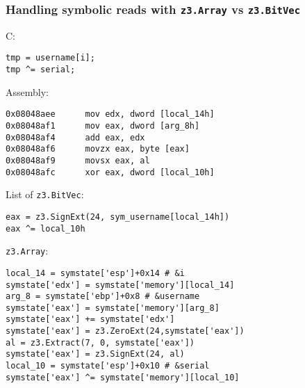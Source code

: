 \documentclass[aspectratio=169]{beamer}
\begin{document}
\begin{frame}[fragile]
\frametitle{Handling symbolic reads with \texttt{z3.Array} vs \texttt{z3.BitVec}}
\begin{minipage}{0.46\textwidth}
C:
\begin{Verbatim}[fontsize=\scriptsize, frame=single]
tmp = username[i];
tmp ^= serial;
\end{Verbatim}
Assembly:
\begin{Verbatim}[fontsize=\scriptsize, frame=single]
0x08048aee      mov edx, dword [local_14h]
0x08048af1      mov eax, dword [arg_8h]
0x08048af4      add eax, edx
0x08048af6      movzx eax, byte [eax]
0x08048af9      movsx eax, al
0x08048afc      xor eax, dword [local_10h]
\end{Verbatim}
\end{minipage}
\begin{minipage}{0.53\textwidth}
List of \verb|z3.BitVec|:
\begin{Verbatim}[fontsize=\scriptsize, frame=single]
eax = z3.SignExt(24, sym_username[local_14h])
eax ^= local_10h
\end{Verbatim}
\verb|z3.Array|:
\begin{Verbatim}[fontsize=\scriptsize, frame=single]
local_14 = symstate['esp']+0x14 # &i
symstate['edx'] = symstate['memory'][local_14]
arg_8 = symstate['ebp']+0x8 # &username
symstate['eax'] = symstate['memory'][arg_8]
symstate['eax'] += symstate['edx']
symstate['eax'] = z3.ZeroExt(24,symstate['eax'])
al = z3.Extract(7, 0, symstate['eax'])
symstate['eax'] = z3.SignExt(24, al)
local_10 = symstate['esp']+0x10 # &serial
symstate['eax'] ^= symstate['memory'][local_10]
\end{Verbatim}
\end{minipage}
\end{frame}
\end{document}
